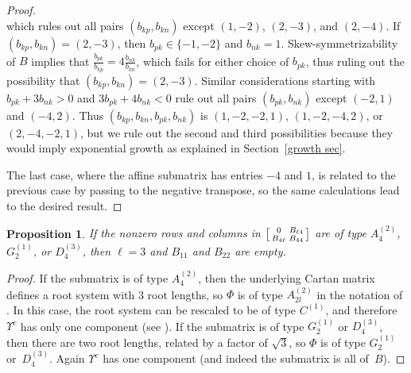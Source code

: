 \documentclass{amsart}
\newtheorem{proposition}{Proposition}[section]
\theoremstyle{definition}
\theoremstyle{remark}
\numberwithin{equation}{section}
\newcommand{\set}[1]{{\lbrace #1 \rbrace}}
\newcommand{\0}{{\mathbf{0}}}
\newcommand{\RSChar}{\Phi}
\newcommand{\RS}{\RSChar}
\newcommand{\RSTChar}{\Upsilon}
\newcommand{\RST}[1]{\RSTChar^{#1}}
\begin{document}
\begin{proof}
\[\]
which rules out all pairs $(b_{kp},b_{kn})$ except $(1,-2)$, $(2,-3)$, and $(2,-4)$.
If $(b_{kp},b_{kn})=(2,-3)$, then $b_{pk}\in\set{-1,-2}$ and $b_{nk}=1$.
Skew-symmetrizability of $B$ implies that $\frac{b_{pk}}{b_{kp}}=4\frac{b_{nk}}{b_{kn}}$, which fails for either choice of $b_{pk}$, thus ruling out the possibility that $(b_{kp},b_{kn})=(2,-3)$.
Similar considerations starting with $b_{pk}+3b_{nk}>0$ and $3b_{pk}+4b_{nk}<0$ rule out all pairs $(b_{pk},b_{nk})$ except $(-2,1)$ and $(-4,2)$.
Thus $(b_{kp},b_{kn},b_{pk},b_{nk})$ is $(1,-2,-2,1)$, $(1,-2,-4,2)$, or $(2,-4,-2,1)$, but we rule out the second and third possibilities because they would imply exponential growth as explained in Section~\ref{growth sec}.

The last case, where the affine submatrix has entries $-4$ and $1$, is related to the previous case by passing to the negative transpose, so the same calculations lead to the desired result.
\end{proof}

\begin{proposition}\label{one component}
If the nonzero rows and columns in $\begin{bsmallmatrix} 0 & B_{\ell4} \\ B_{4\ell} & B_{44} \end{bsmallmatrix}$ are of type $A_{4}^{(2)}$, $G_{2}^{(1)}$, or $D_{4}^{(3)}$, then $\ell=3$ and $B_{11}$ and $B_{22}$ are empty.
\end{proposition}
\begin{proof}
If the submatrix is of type $A_{4}^{(2)}$, then the underlying Cartan matrix defines a root system with 3 root lengths, so $\RS$ is of type $A_{2l}^{(2)}$ in the notation of \cite[Chapter~4]{Kac}.
In this case, the root system can be rescaled to be of type $C^{(1)}$, and therefore $\RST{c}$ has only one component (see \cite[Table 1]{affdenom}).
If the submatrix is of type $G_{2}^{(1)}$ or $D_{4}^{(3)}$, then there are two root lengths, related by a factor of $\sqrt{3}$, so $\RS$ is of type $G_{2}^{(1)}$ or~$D_{4}^{(3)}$.
Again $\RST{c}$ has one component (and indeed the submatrix is all of~$B$).
\end{proof}
\end{document}
